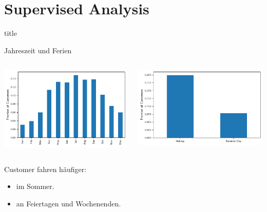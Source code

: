 \section{Supervised Analysis}

\begin{frame}
\begin{beamercolorbox}[sep=8pt,center]{title}
\end{beamercolorbox}
\end{frame}

\begin{frame}{Jahreszeit und Ferien}
\begin{columns}
\begin{column}{0.5\linewidth }
\centering
\includegraphics[width=\linewidth]{../Images/CountByMonthCustomers}
\end{column}
\begin{column}{0.5\linewidth }
\centering
\includegraphics[width=\linewidth]{../Images/CountByBusinessCustomers}
\end{column}
\end{columns}

{
Customer fahren häufiger:
\begin{itemize}
\item im Sommer.
\item an Feiertagen und Wochenenden.
\end{itemize}
}
\end{frame}

